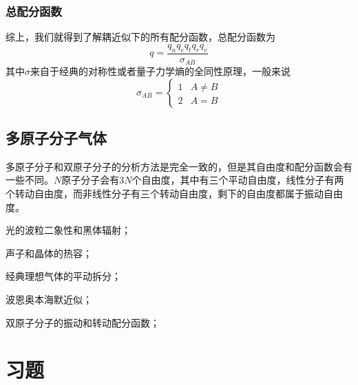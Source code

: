 \subsubsection{总配分函数}

综上，我们就得到了解耦近似下的所有配分函数，总配分函数为\begin{equation}
    q=\frac{q_n q_e q_t q_r q_v}{\sigma_{AB}}
\end{equation}
其中$\sigma$来自于经典的对称性或者量子力学熵的全同性原理，一般来说\begin{equation}
    \sigma_{AB} =\begin{cases}
        1 & A\neq B\\
        2 & A=B
    \end{cases}
\end{equation}

\subsection{多原子分子气体} %
\label{sub:多原子分子气体}
多原子分子和双原子分子的分析方法是完全一致的，但是其自由度和配分函数会有一些不同。$N$原子分子会有$3N$个自由度，其中有三个平动自由度，线性分子有两个转动自由度，而非线性分子有三个转动自由度，剩下的自由度都属于振动自由度。
\begin{review}
    \item 光的波粒二象性和黑体辐射；
    \item 声子和晶体的热容；
    \item 经典理想气体的平动拆分；
    \item 波恩奥本海默近似；
    \item 双原子分子的振动和转动配分函数；
\end{review}
\section{习题} %
\label{sec:习题5}

